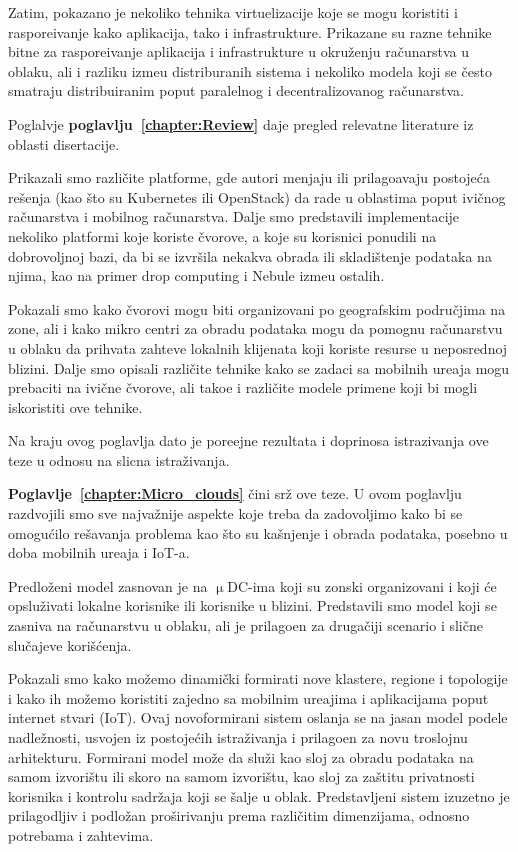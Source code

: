 Zatim, pokazano je nekoliko tehnika virtuelizacije koje se mogu koristiti i raspore\dj ivanje kako aplikacija, tako i infrastrukture. Prikazane su razne tehnike bitne za raspore\dj ivanje aplikacija i infrastrukture u okru\v zenju ra\v cunarstva u oblaku, ali i razliku izme\dj u distriburanih sistema i nekoliko modela koji se \v cesto smatraju distribuiranim poput paralelnog i decentralizovanog ra\v cunarstva.

Poglalvje \textbf{poglavlju~\ref{chapter:Review}} daje pregled relevatne literature iz oblasti disertacije.

Prikazali smo razli\v cite platforme, gde autori menjaju ili prilago\dj avaju postoje\'ca re\v senja (kao \v sto su Kubernetes ili OpenStack) da rade u oblastima poput ivi\v cnog ra\v cunarstva i mobilnog ra\v cunarstva. Dalje smo predstavili implementacije nekoliko platformi koje koriste \v cvorove, a koje su korisnici ponudili na dobrovoljnoj bazi, da bi se izvr\v sila nekakva obrada ili skladi\v stenje podataka na njima, kao na primer drop computing i Nebule izme\dj u ostalih.

Pokazali smo kako \v cvorovi mogu biti organizovani po geografskim podru\v cjima na zone, ali i kako mikro centri za obradu podataka mogu da pomognu ra\v cunarstvu u oblaku da prihvata zahteve lokalnih klijenata koji koriste resurse u neposrednoj blizini. Dalje smo opisali razli\v cite tehnike kako se zadaci sa mobilnih ure\dj aja mogu prebaciti na ivi\v cne \v cvorove, ali tako\dj e i razli\v cite modele primene koji bi mogli iskoristiti ove tehnike.

Na kraju ovog poglavlja dato je pore\dj ejne rezultata i doprinosa istrazivanja ove teze u odnosu na slicna istra\v zivanja.

\textbf{Poglavlje~\ref{chapter:Micro_clouds}} \v cini sr\v z ove teze. U ovom poglavlju razdvojili smo sve najva\v znije aspekte koje treba da zadovoljimo kako bi se omogu\'cilo re\v savanja problema kao \v sto su ka\v snjenje i obrada podataka, posebno u doba mobilnih ure\dj aja i IoT-a.

Predlo\v zeni model zasnovan je na $\upmu$DC-ima koji su zonski organizovani i koji \'ce opslu\v zivati lokalne korisnike ili korisnike u blizini. Predstavili smo model koji se zasniva na ra\v cunarstvu u oblaku, ali je prilago\dj en za druga\v ciji scenario i sli\v cne slu\v cajeve kori\v s\'cenja.

Pokazali smo kako mo\v zemo dinami\v cki formirati nove klastere, regione i topologije i kako ih mo\v zemo koristiti zajedno sa mobilnim ure\dj ajima i aplikacijama poput internet stvari (IoT). Ovaj novoformirani sistem oslanja se na jasan model podele nadle\v znosti, usvojen iz postoje\'cih istra\v zivanja i prilago\dj en za novu troslojnu arhitekturu. Formirani model mo\v ze da slu\v zi kao sloj za obradu podataka na samom izvori\v stu ili skoro na samom izvori\v stu, kao sloj za za\v stitu privatnosti korisnika i kontrolu sadr\v zaja koji se \v salje u oblak. Predstavljeni sistem izuzetno je prilagodljiv i podlo\v zan pro\v sirivanju prema razli\v citim dimenzijama, odnosno potrebama i zahtevima.

